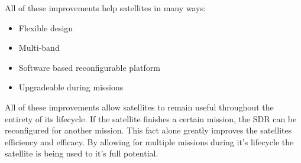 \documentclass[../main.tex]{subfiles}
\begin{document}
All of these improvements help satellites in many ways:

\begin{itemize}
    \item Flexible design
    \item Multi-band
    \item Software based reconfigurable platform
    \item Upgradeable during missions
\end{itemize}

All of these improvements allow satellites to remain useful throughout the entirety of its lifecycle. If the satellite finishes a certain mission, the SDR can be reconfigured for another mission. This fact alone greatly improves the satellites efficiency and efficacy. By allowing for multiple missions during it's lifecycle the satellite is being used to it's full potential.
\end{document}

